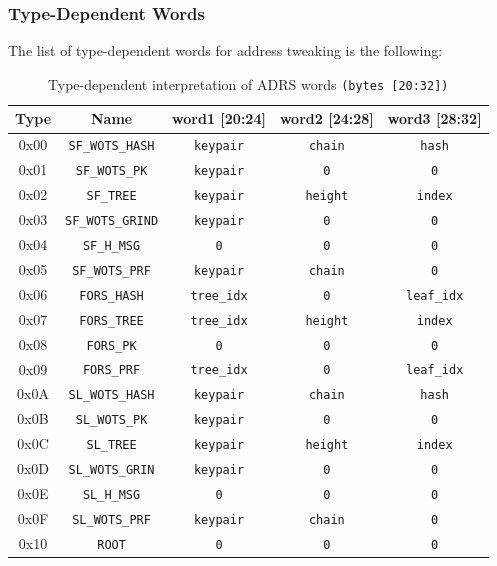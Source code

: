 \subsubsection{Type-Dependent Words}
The list of type-dependent words for address tweaking is the following:
\begin{table}[h!]
\centering
\begin{tabular}{c c c c c}
\hline
\textbf{Type} & \textbf{Name} & \textbf{word1 [20:24]} & \textbf{word2 [24:28]} & \textbf{word3 [28:32]} \\
\hline

0x00 & \texttt{SF\_WOTS\_HASH}   & \texttt{keypair}   & \texttt{chain}   & \texttt{hash} \\
0x01 & \texttt{SF\_WOTS\_PK}     & \texttt{keypair}   & \texttt{0}       & \texttt{0} \\
0x02 & \texttt{SF\_TREE}         & \texttt{keypair}   & \texttt{height}  & \texttt{index} \\
0x03 & \texttt{SF\_WOTS\_GRIND}  & \texttt{keypair}   & \texttt{0}       & \texttt{0} \\
0x04 & \texttt{SF\_H\_MSG}       & \texttt{0}         & \texttt{0}       & \texttt{0} \\
0x05 & \texttt{SF\_WOTS\_PRF}    & \texttt{keypair}   & \texttt{chain}   & \texttt{0} \\
0x06 & \texttt{FORS\_HASH}       & \texttt{tree\_idx} & \texttt{0}       & \texttt{leaf\_idx} \\
0x07 & \texttt{FORS\_TREE}       & \texttt{tree\_idx} & \texttt{height}  & \texttt{index} \\
0x08 & \texttt{FORS\_PK}         & \texttt{0}         & \texttt{0}       & \texttt{0} \\
0x09 & \texttt{FORS\_PRF}        & \texttt{tree\_idx} & \texttt{0}       & \texttt{leaf\_idx} \\
0x0A & \texttt{SL\_WOTS\_HASH}   & \texttt{keypair}   & \texttt{chain}   & \texttt{hash} \\
0x0B & \texttt{SL\_WOTS\_PK}     & \texttt{keypair}   & \texttt{0}       & \texttt{0} \\
0x0C & \texttt{SL\_TREE}         & \texttt{keypair}   & \texttt{height}  & \texttt{index} \\
0x0D & \texttt{SL\_WOTS\_GRIN}   & \texttt{keypair}   & \texttt{0}       & \texttt{0} \\
0x0E & \texttt{SL\_H\_MSG}       & \texttt{0}         & \texttt{0}       & \texttt{0} \\
0x0F & \texttt{SL\_WOTS\_PRF}    & \texttt{keypair}   & \texttt{chain}   & \texttt{0} \\
0x10 & \texttt{ROOT}             & \texttt{0}         & \texttt{0}       & \texttt{0} \\

\hline
\end{tabular}
\caption{Type-dependent interpretation of ADRS words \texttt{(bytes [20:32])}}
\end{table}